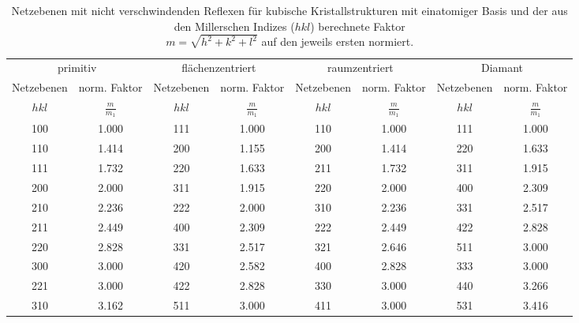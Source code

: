 \begin{table}[!h]
	\centering
	\begin{adjustbox}{width=\textwidth}
		\begin{tabular}{cccccccc}
			\toprule
			\multicolumn{2}{c}{primitiv}&\multicolumn{2}{c}{flächenzentriert} & \multicolumn{2}{c}{raumzentriert}& \multicolumn{2}{c}{Diamant}\\\cmidrule(rl){1-2}\cmidrule(rl){3-4}\cmidrule(rl){5-6}\cmidrule(rl){7-8}
		Netzebenen & norm. Faktor & Netzebenen & norm. Faktor & Netzebenen & norm. Faktor & Netzebenen & norm. Faktor\\
		$hkl$ & $\frac{m}{m_1}$ & $hkl$ & $\frac{m}{m_1}$ & $hkl$ & $\frac{m}{m_1}$ & $hkl$ & $\frac{m}{m_1}$\\
\midrule
		\num{100} & \num{1.000} & \num{111} & \num{1.000} & \num{110} & \num{1.000} & \num{111} & \num{1.000}\\
		\num{110} & \num{1.414} & \num{200} & \num{1.155} & \num{200} & \num{1.414} & \num{220} & \num{1.633}\\
		\num{111} & \num{1.732} & \num{220} & \num{1.633} & \num{211} & \num{1.732} & \num{311} & \num{1.915}\\
		\num{200} & \num{2.000} & \num{311} & \num{1.915} & \num{220} & \num{2.000} & \num{400} & \num{2.309}\\
		\num{210} & \num{2.236} & \num{222} & \num{2.000} & \num{310} & \num{2.236} & \num{331} & \num{2.517}\\
		\num{211} & \num{2.449} & \num{400} & \num{2.309} & \num{222} & \num{2.449} & \num{422} & \num{2.828}\\
		\num{220} & \num{2.828} & \num{331} & \num{2.517} & \num{321} & \num{2.646} & \num{511} & \num{3.000}\\
		\num{300} & \num{3.000} & \num{420} & \num{2.582} & \num{400} & \num{2.828} & \num{333} & \num{3.000}\\
		\num{221} & \num{3.000} & \num{422} & \num{2.828} & \num{330} & \num{3.000} & \num{440} & \num{3.266}\\
		\num{310} & \num{3.162} & \num{511} & \num{3.000} & \num{411} & \num{3.000} & \num{531} & \num{3.416}\\
		\bottomrule
	\end{tabular}
	\end{adjustbox}
	\caption{Netzebenen mit nicht verschwindenden Reflexen für kubische Kristallstrukturen mit einatomiger Basis und der aus 
den Millerschen Indizes ($hkl$) berechnete Faktor\\ $m = \sqrt{h^2+k^2+l^2}$ auf den jeweils ersten normiert. \label{tab:reflexe_1_atom}}
\end{table}
